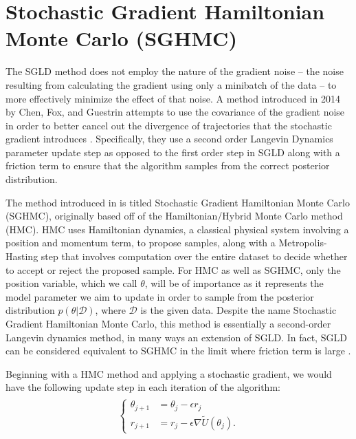 \documentclass[11pt]{article}
\begin{document}
\section{Stochastic Gradient Hamiltonian Monte Carlo (SGHMC)}
The SGLD method does not employ the nature of the gradient noise -- the noise resulting from calculating the gradient using only a minibatch of the data -- to more effectively minimize the effect of that noise. A method introduced in 2014 by Chen, Fox, and Guestrin attempts to use the covariance of the gradient noise in order to better cancel out the divergence of trajectories that the stochastic gradient introduces \cite{Chen:2014:SGH:3044805.3045080}. Specifically, they use a second order Langevin Dynamics parameter update step as opposed to the first order step in SGLD along with a friction term to ensure that the algorithm samples from the correct posterior distribution. \par
The method introduced in \cite{Chen:2014:SGH:3044805.3045080} is titled Stochastic Gradient Hamiltonian Monte Carlo (SGHMC), originally based off of the Hamiltonian/Hybrid Monte Carlo method (HMC). HMC uses Hamiltonian dynamics, a classical physical system involving a position and momentum term, to propose samples, along with a Metropolis-Hasting step that involves computation over the entire dataset to decide whether to accept or reject the proposed sample. For HMC as well as SGHMC, only the position variable, which we call $\theta$, will be of importance as it represents the model parameter we aim to update in order to sample from the posterior distribution $p(\theta|\mathcal{D})$, where $\mathcal{D}$ is the given data. Despite the name Stochastic Gradient Hamiltonian Monte Carlo, this method is essentially a second-order Langevin dynamics method, in many ways an extension of SGLD. In fact, SGLD can be considered equivalent to SGHMC in the limit where friction term is large \cite[\S 3.2]{Chen:2014:SGH:3044805.3045080}. 
\par
Beginning with a HMC method and applying a stochastic gradient, we would have the following update step in each iteration of the algorithm:
\begin{align}
\begin{split}
\begin{cases}
    \theta_{j+1} &= \theta_j - \epsilon r_j\\
r_{j+1}&= r_{j} - \epsilon\nabla\tilde{U}(\theta_j).
\end{cases}
\end{split}
\end{align}
\end{document}
